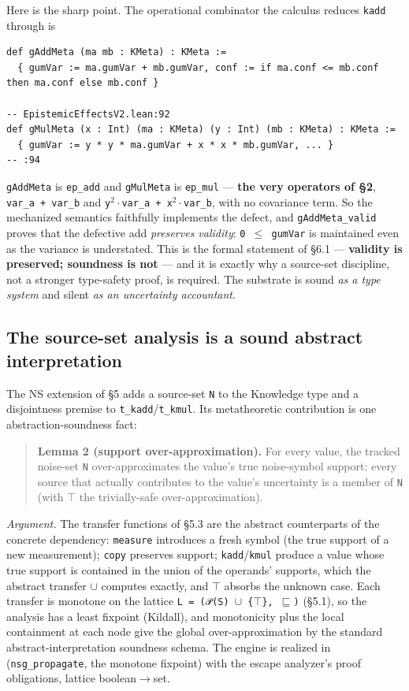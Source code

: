 \documentclass[sigplan,review,anonymous,10pt]{acmart}
\begin{document}
Here is the sharp point. The operational combinator the calculus reduces \texttt{kadd} through is

\begin{lstlisting}
def gAddMeta (ma mb : KMeta) : KMeta :=
  { gumVar := ma.gumVar + mb.gumVar, conf := if ma.conf <= mb.conf then ma.conf else mb.conf }
                                                                       -- EpistemicEffectsV2.lean:92
def gMulMeta (x : Int) (ma : KMeta) (y : Int) (mb : KMeta) : KMeta :=
  { gumVar := y * y * ma.gumVar + x * x * mb.gumVar, ... }              -- :94
\end{lstlisting}

\texttt{gAddMeta} is \texttt{ep\_add} and \texttt{gMulMeta} is \texttt{ep\_mul} --- \textbf{the very operators of §2}, \texttt{var\_a + var\_b} and \texttt{y$^{2}\cdot$var\_a + x$^{2}\cdot$var\_b}, with no covariance term. So the mechanized semantics faithfully implements the defect, and \texttt{gAddMeta\_valid} proves that the defective add \emph{preserves validity}: \texttt{0 $\leq$ gumVar} is maintained even as the variance is understated. This is the formal statement of §6.1 --- \textbf{validity is preserved; soundness is not} --- and it is exactly why a source-set discipline, not a stronger type-safety proof, is required. The substrate is sound \emph{as a type system} and silent \emph{as an uncertainty accountant}.

\subsection{The source-set analysis is a sound abstract interpretation}

The NS extension of §5 adds a source-set \texttt{N} to the Knowledge type and a disjointness premise to \texttt{t\_kadd}/\texttt{t\_kmul}. Its metatheoretic contribution is one abstraction-soundness fact:

\begin{quote}
\textbf{Lemma 2 (support over-approximation).} For every value, the tracked noise-set \texttt{N} over-approximates the value's true noise-symbol support: every source that actually contributes to the value's uncertainty is a member of \texttt{N} (with \texttt{$\top$} the trivially-safe over-approximation).
\end{quote}

\emph{Argument.} The transfer functions of §5.3 are the abstract counterparts of the concrete dependency: \texttt{measure} introduces a fresh symbol (the true support of a new measurement); \texttt{copy} preserves support; \texttt{kadd}/\texttt{kmul} produce a value whose true support is contained in the union of the operands' supports, which the abstract transfer \texttt{$\cup$} computes exactly, and \texttt{$\top$} absorbs the unknown case. Each transfer is monotone on the lattice \texttt{L = (𝒫(S) $\cup$ \{$\top$\}, $\sqsubseteq$)} (§5.1), so the analysis has a least fixpoint (Kildall), and monotonicity plus the local containment at each node give the global over-approximation by the standard abstract-interpretation soundness schema. The engine is realized in  (\texttt{nsg\_propagate}, the monotone fixpoint) with the escape analyzer's proof obligations, lattice boolean$\rightarrow$set.
\end{document}
